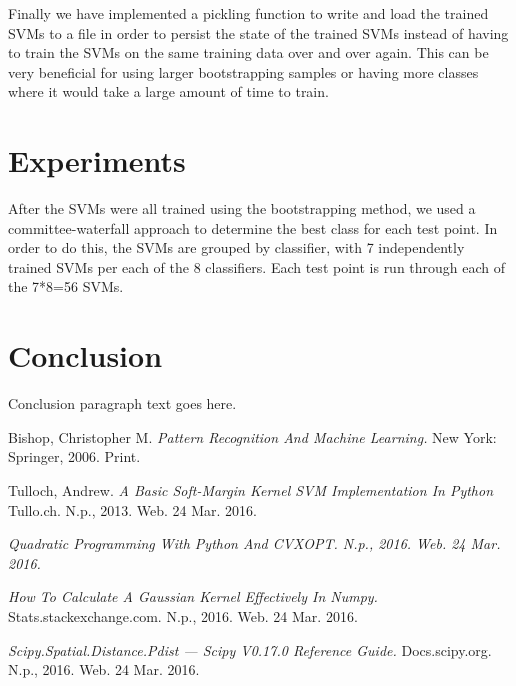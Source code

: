 \documentclass[journal]{IEEEtran}
\begin{document}
    Finally we have implemented a pickling function to write and load the trained SVMs to a file in order to persist the state of the trained SVMs instead of having to train the SVMs on the same training data over and over again. This can be very beneficial for using larger bootstrapping samples or having more classes where it would take a large amount of time to train.\\




\section{Experiments}

After the SVMs were all trained using the bootstrapping method, we used a committee-waterfall approach to determine the best class for each test point.  In order to do this, the SVMs are grouped by classifier, with 7 independently trained SVMs per each of the 8 classifiers.  Each test point is run through each of the 7*8=56 SVMs.

\section{Conclusion}
Conclusion paragraph text goes here.


\ifCLASSOPTIONcaptionsoff
  \newpage
\fi

\begin{thebibliography}{1}

  Bishop, Christopher M. \emph{Pattern Recognition And Machine Learning.} New York: Springer, 2006. Print.

  Tulloch, Andrew. \emph{A Basic Soft-Margin Kernel SVM Implementation In Python} Tullo.ch. N.p., 2013. Web. 24 Mar. 2016.

  \emph{Quadratic Programming With Python And CVXOPT. N.p., 2016. Web. 24 Mar. 2016.}

  \emph{How To Calculate A Gaussian Kernel Effectively In Numpy.} Stats.stackexchange.com. N.p., 2016. Web. 24 Mar. 2016.

  \emph{Scipy.Spatial.Distance.Pdist — Scipy V0.17.0 Reference Guide.} Docs.scipy.org. N.p., 2016. Web. 24 Mar. 2016.

\end{thebibliography}
\end{document}
